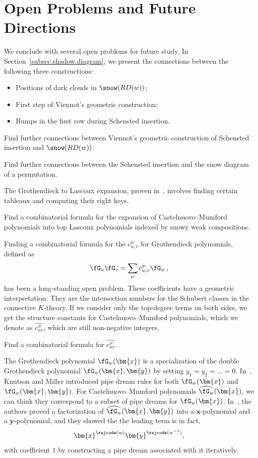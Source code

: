 \section{Open Problems and Future Directions}\label{sec.open}
We conclude with several open problems for future study.
In Section~\ref{subsec.shadow.diagram}, we present the connections between the
following three constructions:
\begin{itemize}
\item[-] Positions of dark clouds in $\snow(RD(w))$;
\item[-] First step of Viennot's geometric construction;
\item[-] Bumps in the first row during Schensted insertion. 
\end{itemize}

\begin{prob}
Find further connections between Viennot's geometric  construction of Schensted insertion
and $\snow(RD(w))$.
\end{prob}

\begin{prob}
Find further connections between the Schensted insertion and the snow diagram of a permutation.
\end{prob}

The Grothendieck to Lascoux expansion, proven in~\cite{SY}, 
involves finding certain tableaux and computing their right keys.


\begin{prob}
Find a combinatorial formula for the expansion of Castelnuovo--Mumford polynomials
into top Lascoux polynomials indexed by snowy weak compositions. 
\end{prob}

Finding a combinatorial formula for the  $c^w_{u,v}$ 
for Grothendieck polynomials, defined as
\[
\fG_u \fG_v = \sum_{w} c^w_{u,v}\fG_w\,,
\] 
has been a long-standing open problem.
These coefficients have a geometric interpretation: They are the intersection 
numbers for the Schubert classes in the connective $K$-theory. 
If we consider only the top-degree terms on both sides, we get the structure 
constants for Castelnuovo--Mumford polynomials, which we denote as $\widehat{c^w_{uv}}$,
which are still non-negative integers.


\begin{prob}
Find a combinatorial formula for $\widehat{c^w_{uv}}$.
\end{prob}

The Grothendieck polynomial $\fG_w(\bm{x})$ is a specialization of the double 
Grothendieck polynomial $\fG_w(\bm{x},\bm{y})$ by setting $y_1=y_2 = \dots = 0$. 
In~\cite{KM}, Knutson and Miller introduced pipe dream rules for both
$\fG_w(\bm{x})$ and $\fG_w(\bm{x},\bm{y})$.
For Castelnuovo--Mumford polynomials $\widehat{\fG_w}(\bm{x})$, we can think they 
correspond to a subset of pipe dreams for $\fG_w(\bm{x})$.
In~\cite{PSW}, the authors proved a factorization of $\widehat{\fG_w}(\bm{x},\bm{y})$
into a $\bm{x}$-polynomial and a $\bm{y}$-polynomial, and they showed the 
the leading term is in fact,
\[
\bm{x}^{\rajcode(w)} \bm{y}^{\rajcode(w^{-1})},
\]
with coefficient $1$ by constructing a pipe dream associated with it iteratively.

